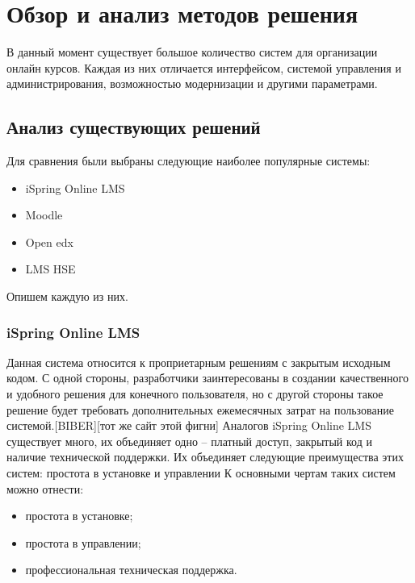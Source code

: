 \documentclass[a4paper,14pt]{article}
\begin{document}




\section{Обзор и анализ методов решения}

В данный момент существует большое количество систем для организации онлайн курсов.
Каждая из них отличается интерфейсом, системой управления и администрирования, возможностью модернизации и другими параметрами.

\subsection{Анализ существующих решений}

Для сравнения были выбраны следующие наиболее популярные системы:

\begin{itemize}
	\item iSpring Online LMS
	\item Moodle	
	\item Open edx
	\item LMS HSE
\end{itemize}

Опишем каждую из них.

\subsubsection{iSpring Online LMS}

Данная система относится к проприетарным решениям с закрытым исходным кодом.
С одной стороны, разработчики заинтересованы в создании качественного и удобного решения для конечного пользователя, но с другой стороны такое решение будет требовать дополнительных ежемесячных затрат на пользование системой.[BIBER][тот же сайт этой фигни]
Аналогов iSpring Online LMS существует много, их объединяет одно -- платный доступ, закрытый код и наличие технической поддержки.
Их объединяет следующие преимущества этих систем: простота в установке и управлении
К основными чертам таких систем можно отнести:
\begin{itemize}
	\item простота в установке;
	\item простота в управлении;	
	\item профессиональная техническая поддержка.
\end{itemize}
\end{document}
